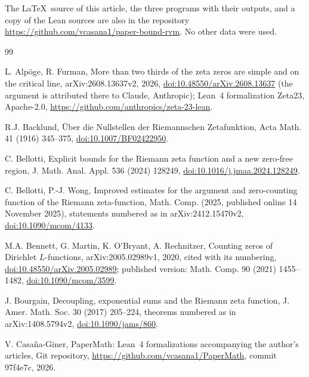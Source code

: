 \documentclass[11pt,a4paper]{article}
\numberwithin{equation}{section}
\theoremstyle{definition}
\theoremstyle{remark}
\begin{document}
The \LaTeX\ source of this article, the three programs with their outputs, and a copy of the Lean sources are also in the repository \url{https://github.com/vcasana1/paper-bound-rvm}. No other data were used.

\begin{thebibliography}{99}

 L. Alp\"oge, R. Furman, More than two thirds of the zeta zeros are simple and on the critical line, arXiv:2608.13637v2, 2026, \href{https://doi.org/10.48550/arXiv.2608.13637}{doi:10.48550/arXiv.2608.13637} (the argument is attributed there to Claude, Anthropic); Lean~4 formalization Zeta23, Apache-2.0, \url{https://github.com/anthropics/zeta-23-lean}.

 R.J. Backlund, \"Uber die Nullstellen der Riemannschen Zetafunktion, Acta Math. 41 (1916) 345--375, \href{https://doi.org/10.1007/BF02422950}{doi:10.1007/BF02422950}.

 C. Bellotti, Explicit bounds for the Riemann zeta function and a new zero-free region, J. Math. Anal. Appl. 536 (2024) 128249, \href{https://doi.org/10.1016/j.jmaa.2024.128249}{doi:10.1016/j.jmaa.2024.128249}.

 C. Bellotti, P.-J. Wong, Improved estimates for the argument and zero-counting function of the Riemann zeta-function, Math. Comp. (2025, published online 14 November 2025), statements numbered as in arXiv:2412.15470v2, \href{https://doi.org/10.1090/mcom/4133}{doi:10.1090/mcom/4133}.

 M.A. Bennett, G. Martin, K. O'Bryant, A. Rechnitzer, Counting zeros of Dirichlet $L$-functions, arXiv:2005.02989v1, 2020, cited with its numbering, \href{https://doi.org/10.48550/arXiv.2005.02989}{doi:10.48550/arXiv.2005.02989}; published version: Math. Comp. 90 (2021) 1455--1482, \href{https://doi.org/10.1090/mcom/3599}{doi:10.1090/mcom/3599}.

 J. Bourgain, Decoupling, exponential sums and the Riemann zeta function, J. Amer. Math. Soc. 30 (2017) 205--224, theorems numbered as in arXiv:1408.5794v2, \href{https://doi.org/10.1090/jams/860}{doi:10.1090/jams/860}.

 V. Casa\~na-Giner, PaperMath: Lean~4 formalizations accompanying the author's articles, Git repository, \url{https://github.com/vcasana1/PaperMath}, commit 97f4e7c, 2026.


\end{thebibliography}
\end{document}
